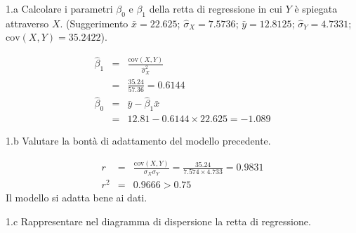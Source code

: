 \documentclass[
  11pt,
]{book}
\theoremstyle{mytheoremstyle}
\theoremstyle{mydefstyle}
\newenvironment{sol}
  {
  \begin{tcolorbox}[enhanced,breakable,arc=0.1mm,boxrule=1pt,colback=white,colframe=iblue,
  title=\bf \fontfamily{lmss}\selectfont \hspace{.5 cm} Soluzione,drop fuzzy shadow]

}{
\end{tcolorbox}
  }
\begin{document}
1.a Calcolare i parametri \(\beta_{0}\) e \(\beta_{1}\)
della retta di regressione in cui \(Y\) è spiegata attraverso \(X\).
(Suggerimento \(\bar{x} = 22.625\); \(\hat\sigma_{X} = 7.5736\);
\(\bar{y} = 12.8125\); \(\hat\sigma_{Y} = 4.7331\); \(\text{cov}(X,Y)= 35.2422\)).

\begin{sol}
\begin{eqnarray*}
       \hat\beta_1 &=& \frac{\text{cov}(X,Y)}{\hat\sigma_X^2} \\
            &=& \frac{ 35.24 }{ 57.36 }  =  0.6144 \\
      \hat\beta_0 &=& \bar y - \hat\beta_1 \bar x\\
          &=&  12.81 - 0.6144 \times  22.625 = -1.089 
      \end{eqnarray*}

\end{sol}

1.b Valutare la bontà di adattamento del modello precedente.

\begin{sol}
\begin{eqnarray*}
r&=&\frac{\text{cov}(X,Y)}{\sigma_X\sigma_Y}=\frac{ 35.24 }{ 7.574 \times 4.733 }= 0.9831 \\r^2&=& 0.9666 > 0.75
\end{eqnarray*}
Il modello si adatta bene ai dati.

\end{sol}

1.c Rappresentare nel diagramma di dispersione la retta di regressione.
\end{document}
